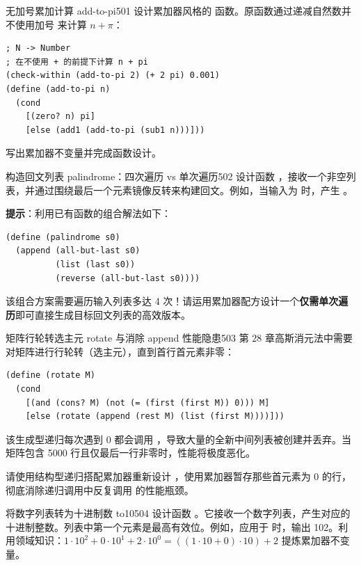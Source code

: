 \begin{exercise}{无加号累加计算 add-to-pi}{501}
设计累加器风格的  函数。原函数通过递减自然数并不使用加号 \code{+} 来计算 $n + \pi$：
\begin{lstlisting}[language=BSL]
; N -> Number
; 在不使用 + 的前提下计算 n + pi
(check-within (add-to-pi 2) (+ 2 pi) 0.001)
(define (add-to-pi n)
  (cond
    [(zero? n) pi]
    [else (add1 (add-to-pi (sub1 n)))]))
\end{lstlisting}
写出累加器不变量并完成函数设计。
\end{exercise}

\begin{exercise}{构造回文列表 palindrome：四次遍历 vs 单次遍历}{502}
设计函数 ，接收一个非空列表，并通过围绕最后一个元素镜像反转来构建回文。例如，当输入为  时，产生 。

\textbf{提示}：利用已有函数的组合解法如下：
\begin{lstlisting}[language=BSL]
(define (palindrome s0)
  (append (all-but-last s0)
          (list (last s0))
          (reverse (all-but-last s0))))
\end{lstlisting}
该组合方案需要遍历输入列表多达 4 次！请运用累加器配方设计一个\textbf{仅需单次遍历}即可直接生成目标回文列表的高效版本。
\end{exercise}

\begin{exercise}{矩阵行轮转选主元 rotate 与消除 append 性能隐患}{503}
第 28 章高斯消元法中需要对矩阵进行行轮转（选主元），直到首行首元素非零：
\begin{lstlisting}[language=BSL]
(define (rotate M)
  (cond
    [(and (cons? M) (not (= (first (first M)) 0))) M]
    [else (rotate (append (rest M) (list (first M))))]))
\end{lstlisting}
该生成型递归每次遇到 0 都会调用 ，导致大量的全新中间列表被创建并丢弃。当矩阵包含 5000 行且仅最后一行非零时，性能将极度恶化。

请使用结构型递归搭配累加器重新设计 ，使用累加器暂存那些首元素为 0 的行，彻底消除递归调用中反复调用  的性能瓶颈。
\end{exercise}

\begin{exercise}{将数字列表转为十进制数 to10}{504}
设计函数 。它接收一个数字列表，产生对应的十进制整数。列表中第一个元素是最高有效位。例如，应用于  时，输出 102。利用领域知识：$1 \cdot 10^2 + 0 \cdot 10^1 + 2 \cdot 10^0 = ((1 \cdot 10 + 0) \cdot 10) + 2$ 提炼累加器不变量。
\end{exercise}

